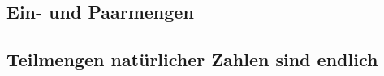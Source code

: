 \documentclass[main.tex]{subfiles}
\begin{document}
\subsection{Ein- und Paarmengen}

\begin{tabproof}
  \proofstep{}{\Finite{\varnothing}}{\FormulaRefAuto{\Finite{\varnothing}}}
\end{tabproof}

\begin{tabproof}
\end{tabproof}

\subsection{Teilmengen natürlicher Zahlen sind endlich}

\end{document}
